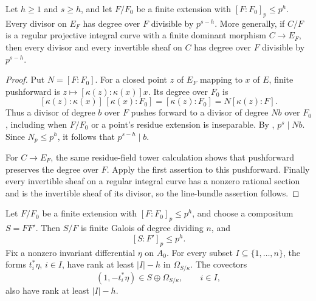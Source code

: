 \begin{corollary}\label{cor:index-base-change}
Let $h\geq1$ and $s\geq h$, and let $F/F_0$ be a finite extension
with $[F:F_0]_p\leq p^h$.  Every divisor on $E_F$ has degree over
$F$ divisible by $p^{s-h}$.  More generally, if $C/F$ is a regular
projective integral curve with a finite dominant morphism
$C\to E_F$, then every divisor and every invertible sheaf on $C$
has degree over $F$ divisible by $p^{s-h}$.
\end{corollary}

\begin{proof}
Put $N=[F:F_0]$.  For a closed point $z$ of $E_F$ mapping to $x$
of $E$, finite pushforward is
$z\mapsto[\kappa(z):\kappa(x)]x$.  Its degree over $F_0$ is
\[
 [\kappa(z):\kappa(x)]\,[\kappa(x):F_0]
       =[\kappa(z):F_0]=N[\kappa(z):F].
\]
Thus a divisor of degree $b$ over $F$ pushes forward to a divisor
of degree $Nb$ over $F_0$, including when $F/F_0$ or a point's
residue extension is inseparable.  By ,
$p^s\mid Nb$.  Since $N_p\leq p^h$, it follows that
$p^{s-h}\mid b$.

For $C\to E_F$, the same residue-field tower calculation shows
that pushforward preserves the degree over $F$.  Apply the first
assertion to this pushforward.  Finally every invertible sheaf on a
regular integral curve has a nonzero rational section and is the
invertible sheaf of its divisor, so the line-bundle assertion follows.
\end{proof}

\begin{lemma}\label{lem:label-rank}
Let $F/F_0$ be a finite extension with $[F:F_0]_p\leq p^h$, and
choose a compositum $S=FF'$.  Then $S/F$ is finite Galois of degree
dividing $n$, and
\begin{equation}\label{eq:compositum-small-p-part}
                            [S:F']_p\leq p^h.
\end{equation}
Fix a nonzero invariant differential $\eta$ on $A_0$.  For every
subset $I\subseteq\{1,\ldots,n\}$, the forms $t_i^*\eta$,
$i\in I$, have rank at least $|I|-h$ in $\Omega_{S/\kappa}$.
The covectors
\begin{equation}\label{eq:label-covectors}
                    (1,-t_i^*\eta)\in S\oplus\Omega_{S/\kappa},
                    \qquad i\in I,
\end{equation}
also have rank at least $|I|-h$.
\end{lemma}

